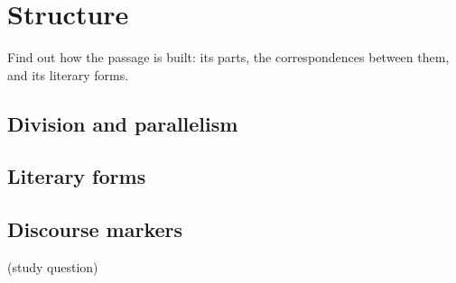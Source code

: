 \chapter{Structure}\label{cap:estrutura}

\begin{objetivo}
Find out how the passage is built: its parts, the correspondences between them, and its literary forms.
\end{objetivo}

\section{Division and parallelism}

\section{Literary forms}

\section{Discourse markers}

\begin{pergunta}
(study question)
\end{pergunta}
